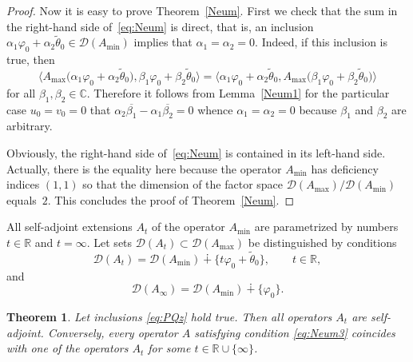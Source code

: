 \documentclass[pdftex]{sigma}%
\numberwithin{equation}{section}
\newtheorem{Theorem}{Theorem}[section]
\begin{document}
\begin{proof}
 Now it is easy to prove Theorem~\ref{Neum}. First we check that the sum in the right-hand side of~\eqref{eq:Neum} is direct, that is, an inclusion
 $
\alpha_{1} \varphi_{0}+ \alpha_{2} \tilde{\theta}_{0 }\in {\mathcal D}(A_{\min})
$
 implies that $\alpha_{1}= \alpha_{2} =0$. Indeed, if this inclusion is true, then
 \[
 \big\langle A_{\max} \big(\alpha_{1} \varphi_{0}+ \alpha_{2} \tilde{\theta}_{0 }\big), \beta_{1} \varphi_{0}+ \beta_{2} \tilde{\theta}_{0 }\big\rangle = \big\langle \alpha_{1} \varphi_{0}+ \alpha_{2} \tilde{\theta}_{0 }, A_{\max} \big(\beta_{1} \varphi_{0}+ \beta_{2} \tilde{\theta}_{0 }\big)\big\rangle
 \]
 for all $\beta_{1}, \beta_{2}\in {\mathbb C}$. Therefore it follows from Lemma~\ref{Neum1} for the particular case $u_{0}=v_{0}=0$ that $ \alpha_{2} \overline{\beta_{1}}-\alpha_{1} \overline{\beta_{2}}=0$ whence $ \alpha_{1} = \alpha_{2}=0$ because $ \beta_{1} $ and $ \beta_{2}$ are arbitrary.

 Obviously, the right-hand side of~\eqref{eq:Neum} is contained in its left-hand side. Actually, there is the equality here because the operator $A_{\min}$ has deficiency indices $(1,1)$ so that the dimension of the factor space $ {\mathcal D}(A_{\max}) / {\mathcal D}(A_{\min}) $ equals~$2$. This concludes the proof of Theorem~\ref{Neum}.
 \end{proof}

All self-adjoint extensions $A_{t}$ of the operator $A_{\min}$ are parametrized by numbers $ t\in {\mathbb R}$ and $t=\infty$. Let sets ${\mathcal D}(A_{t})\subset {\mathcal D}(A_{\max})$ be distinguished by conditions
 \begin{equation}
{\mathcal D}(A_{t})= {\mathcal D}(A_{\min})\dotplus \big\{ t \varphi_{0} + \tilde{\theta}_{0}\big\}, \qquad t\in {\mathbb R},
 \label{eq:Neum1}\end{equation}
and
 \begin{equation}
{\mathcal D}(A_\infty)= {\mathcal D}(A_{\min})\dotplus \{ \varphi_{0 } \}.
 \label{eq:Neum2}\end{equation}

\begin{Theorem}\label{Neum2}
 Let inclusions \eqref{eq:PQz} hold true. Then all operators $A_{t}$ are self-adjoint. Conversely, every operator $A$ satisfying condition
 \eqref{eq:Neum3}
coincides with one of the operators $A_{t}$ for some $t\in{\mathbb R}\cup \{\infty\}$.
 \end{Theorem}
\end{document}
